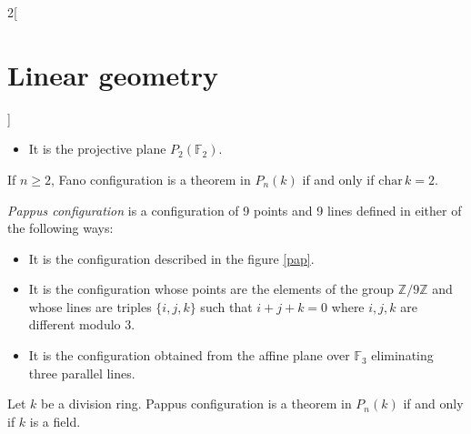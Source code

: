 \documentclass[class=article,10pt,crop=false]{standalone}
\begin{document}
\begin{multicols}{2}[\section{Linear geometry}]
\begin{definition}
\begin{itemize}
    \item It is the projective plane $P_2(\mathbb{F}_2)$.
\end{itemize}
\end{definition}
\begin{theorem}
If $n\geq 2$, Fano configuration is a theorem in $P_n(k)$ if and only if $\text{char}\,k=2$.
\end{theorem}
\begin{definition}
\textit{Pappus configuration} is a configuration of 9 points and 9 lines defined in either of the following ways:
\begin{itemize}
    \item It is the configuration described in the figure \ref{pap}.
    \begin{figure}[h] 
        \centering
    \end{figure}  
    \item It is the configuration whose points are the elements of the group $\mathbb{Z}/9\mathbb{Z}$ and whose lines are triples $\{i,j,k\}$ such that $i+j+k=0$ where $i,j,k$ are different modulo 3.
    \item It is the configuration obtained from the affine plane over $\mathbb{F}_3$ eliminating three parallel lines.
\end{itemize}
\end{definition}
\begin{theorem}
Let $k$ be a division ring. Pappus configuration is a theorem in $P_n(k)$ if and only if $k$ is a field.
\end{theorem}

\end{multicols}
\end{document}
